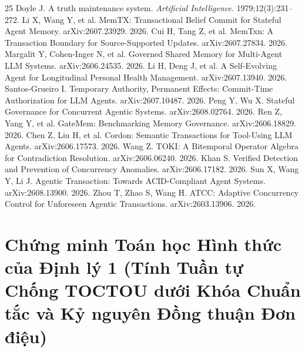 \documentclass[11pt]{article}
\begin{document}
\begin{thebibliography}{25}
 Doyle J. A truth maintenance system. \emph{Artificial Intelligence}. 1979;12(3):231--272.
 Li X, Wang Y, et al. MemTX: Transactional Belief Commit for Stateful Agent Memory. arXiv:2607.23929. 2026.
 Cui H, Tang Z, et al. MemTxn: A Transaction Boundary for Source-Supported Updates. arXiv:2607.27834. 2026.
 Margalit Y, Cohen-Inger N, et al. Governed Shared Memory for Multi-Agent LLM Systems. arXiv:2606.24535. 2026.
 Li H, Deng J, et al. A Self-Evolving Agent for Longitudinal Personal Health Management. arXiv:2607.13940. 2026.
 Santos-Grueiro I. Temporary Authority, Permanent Effects: Commit-Time Authorization for LLM Agents. arXiv:2607.10487. 2026.
 Peng Y, Wu X. Stateful Governance for Concurrent Agentic Systems. arXiv:2608.02764. 2026.
 Ren Z, Yang Y, et al. GateMem: Benchmarking Memory Governance. arXiv:2606.18829. 2026.
 Chen Z, Liu H, et al. Cordon: Semantic Transactions for Tool-Using LLM Agents. arXiv:2606.17573. 2026.
 Wang Z. TOKI: A Bitemporal Operator Algebra for Contradiction Resolution. arXiv:2606.06240. 2026.
 Khan S. Verified Detection and Prevention of Concurrency Anomalies. arXiv:2606.17182. 2026.
 Sun X, Wang Y, Li J. Agentic Transaction: Towards ACID-Compliant Agent Systems. arXiv:2608.13900. 2026.
 Zhou T, Zhao S, Wang H. ATCC: Adaptive Concurrency Control for Unforeseen Agentic Transactions. arXiv:2603.13906. 2026.
\end{thebibliography}

\newpage
\appendix
\section{Chứng minh Toán học Hình thức của Định lý 1 (Tính Tuần tự Chống TOCTOU dưới Khóa Chuẩn tắc và Kỷ nguyên Đồng thuận Đơn điệu)}
\label{sec:proofs_vi}
\end{document}

